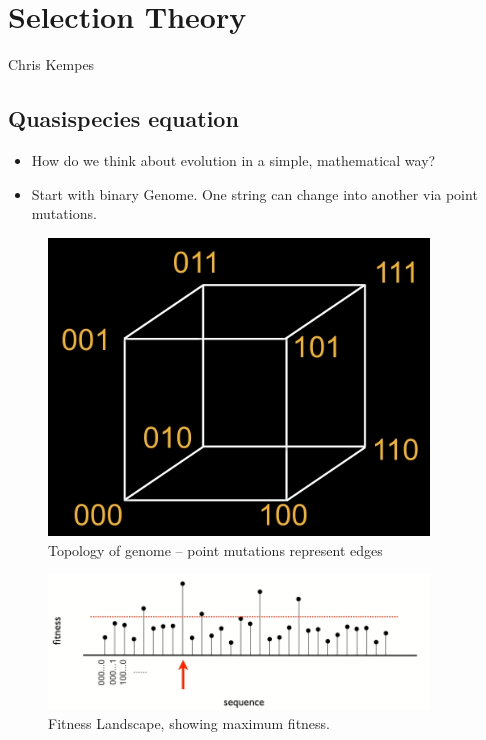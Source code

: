 \documentclass[]{article}
\begin{document}
\section{Selection Theory}
Chris Kempes

\subsection{Quasispecies equation}
\begin{itemize}
	\item How do we think about evolution in a simple, mathematical way?
	\item Start with binary Genome. One string can change into another via point mutations.
\end{itemize}


\begin{figure}[H]
	\caption{Topology of genome -- point mutations represent edges}\label{fig:GenomeTopology} 
	\includegraphics[width=0.9\textwidth]{GenomeTopology}
\end{figure}

\begin{figure}[H]
	\caption{Fitness Landscape, showing maximum fitness.}\label{fig:FitnessLandscape} 
	\includegraphics[width=0.9\textwidth]{FitnessLandscape}
\end{figure}
\end{document}
